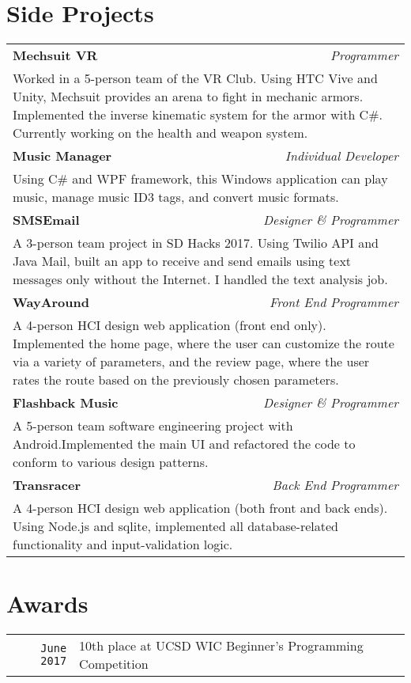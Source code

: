 \documentclass[12pt, letterpaper]{article}
\begin{document}
\smallskip

\section{Side Projects}
\smallskip
\noindent
\begin{tabular}{l r}	
\textbf{\large Mechsuit VR} & \textit{Programmer} \\
\multicolumn{2}{p{\linewidth}}{Worked in a 5-person team of the VR Club. Using HTC Vive and Unity, Mechsuit provides an arena to fight in mechanic armors. Implemented the inverse kinematic system for the armor with C\#. Currently working on the health and weapon system.} \\
\textbf{\large Music Manager} & \textit{Individual Developer} \\
\multicolumn{2}{p{\linewidth}}{Using C\# and WPF framework, this Windows application can play music, manage music ID3 tags, and convert music formats.} \\
\textbf{\large SMSEmail} & \textit{Designer \& Programmer} \\
\multicolumn{2}{p{\linewidth}}{A 3-person team project in SD Hacks 2017. Using Twilio API and Java Mail, built an app to receive and send emails using text messages only without the Internet. I handled the text analysis job.} \\
\textbf{\large WayAround} & \textit{Front End Programmer} \\
\multicolumn{2}{p{\linewidth}}{A 4-person HCI design web application (front end only). Implemented the home page, where the user can customize the route via a variety of parameters, and the review page, where the user rates the route based on the previously chosen parameters.} \\
\textbf{\large Flashback Music} & \textit{Designer \& Programmer} \\
\multicolumn{2}{p{\linewidth}}{A 5-person team software engineering project with Android.Implemented the main UI and refactored the code to conform to various design patterns.} \\
\textbf{\large Transracer} & \textit{Back End Programmer} \\
\multicolumn{2}{p{\linewidth}}{A 4-person HCI design web application (both front and back ends). Using Node.js and sqlite, implemented all database-related functionality and input-validation logic.}
\end{tabular}

\smallskip

\section{Awards}
\smallskip
\noindent
\begin{tabularx}{\linewidth}{r | X}
	\texttt{June 2017} & 10th place at UCSD WIC Beginner's Programming Competition
\end{tabularx}
\end{document}
